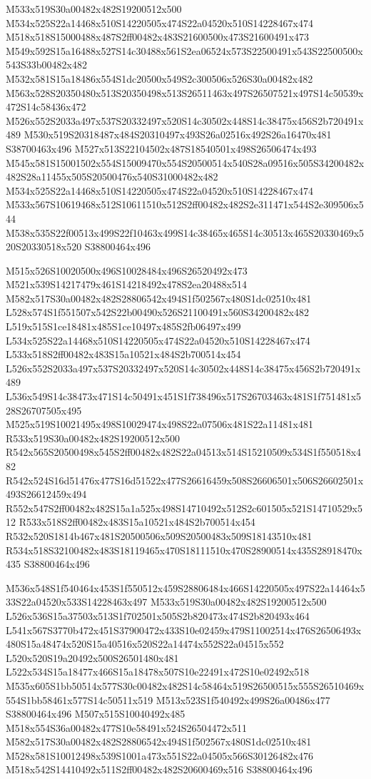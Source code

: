 \documentclass{article}
\begin{document}
\begin{multicols}{2}
M533x519S30a00482x482S19200512x500 M534x525S22a14468x510S14220505x474S22a04520x510S14228467x474 M518x518S15000488x487S2ff00482x483S21600500x473S21600491x473 M549x592S15a16488x527S14c30488x561S2ea06524x573S22500491x543S22500500x543S33b00482x482 M532x581S15a18486x554S1dc20500x549S2c300506x526S30a00482x482 M563x528S20350480x513S20350498x513S26511463x497S26507521x497S14c50539x472S14c58436x472 M526x552S2033a497x537S20332497x520S14c30502x448S14c38475x456S2b720491x489 M530x519S20318487x484S20310497x493S26a02516x492S26a16470x481 S38700463x496 M527x513S22104502x487S18540501x498S26506474x493 M545x581S15001502x554S15009470x554S20500514x540S28a09516x505S34200482x482S28a11455x505S20500476x540S31000482x482 M534x525S22a14468x510S14220505x474S22a04520x510S14228467x474 M533x567S10619468x512S10611510x512S2ff00482x482S2e311471x544S2e309506x544 M538x535S22f00513x499S22f10463x499S14c38465x465S14c30513x465S20330469x520S20330518x520 S38800464x496

M515x526S10020500x496S10028484x496S26520492x473 M521x539S14217479x461S14218492x478S2ea20488x514 M582x517S30a00482x482S28806542x494S1f502567x480S1dc02510x481 L528x574S1f551507x542S22b00490x526S21100491x560S34200482x482 L519x515S1ce18481x485S1ce10497x485S2fb06497x499 L534x525S22a14468x510S14220505x474S22a04520x510S14228467x474 L533x518S2ff00482x483S15a10521x484S2b700514x454 L526x552S2033a497x537S20332497x520S14c30502x448S14c38475x456S2b720491x489 L536x549S14c38473x471S14c50491x451S1f738496x517S26703463x481S1f751481x528S26707505x495 M525x519S10021495x498S10029474x498S22a07506x481S22a11481x481 R533x519S30a00482x482S19200512x500 R542x565S20500498x545S2ff00482x482S22a04513x514S15210509x534S1f550518x482 R542x524S16d51476x477S16d51522x477S26616459x508S26606501x506S26602501x493S26612459x494 R552x547S2ff00482x482S15a1a525x498S14710492x512S2c601505x521S14710529x512 R533x518S2ff00482x483S15a10521x484S2b700514x454 R532x520S1814b467x481S20500506x509S20500483x509S18143510x481 R534x518S32100482x483S18119465x470S18111510x470S28900514x435S28918470x435 S38800464x496

M536x548S1f540464x453S1f550512x459S28806484x466S14220505x497S22a14464x533S22a04520x533S14228463x497 M533x519S30a00482x482S19200512x500 L526x536S15a37503x513S1f702501x505S2b820473x474S2b820493x464 L541x567S3770b472x451S37900472x433S10e02459x479S11002514x476S26506493x480S15a48474x520S15a40516x520S22a14474x552S22a04515x552 L520x520S19a20492x500S26501480x481 L522x534S15a18477x466S15a18478x507S10e22491x472S10e02492x518 M535x605S1bb50514x577S30c00482x482S14c58464x519S26500515x555S26510469x554S1bb58461x577S14c50511x519 M513x523S1f540492x499S26a00486x477 S38800464x496 M507x515S10040492x485 M518x554S36a00482x477S10e58491x524S26504472x511 M582x517S30a00482x482S28806542x494S1f502567x480S1dc02510x481 M528x581S10012498x539S1001a473x551S22a04505x566S30126482x476 M518x542S14410492x511S2ff00482x482S20600469x516 S38800464x496


\end{multicols}
\end{document}
